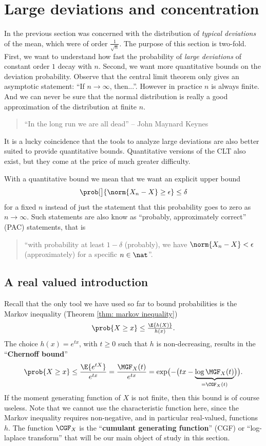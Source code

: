 \section{Large deviations and concentration}
\label{sec: concentration inequalities}

In the previous section was concerned with the distribution of \emph{typical deviations} of
the mean, which were of order \(\frac1{\sqrt{n}}\). The purpose of this section is two-fold. First, we want to understand
how fast the probability of \emph{large deviations} of constant order \(1\) decay with \(n\).
Second, we want more quantitative bounds on the deviation probability.
Observe that the central limit theorem only gives an asymptotic statement:
``If \(n\to\infty\), then...''. However in practice \(n\) is always finite.
And we can never be sure that the normal distribution is really a good
approximation of the distribution at finite \(n\).
\begin{quotation}
    ``In the long run we are all dead'' -- John Maynard Keynes 
\end{quotation}
It is a lucky coincidence that the tools to analyze large deviations are also
better suited to provide quantitative bounds. Quantitative versions of the CLT
also exist, but they come at the price of much greater difficulty.

With a quantitative bound we mean that we want an explicit upper bound
\[
    \prob[\big]{\norm{X_n - X} \ge \epsilon} \le \delta
\]
for a fixed \(n\) instead of just the statement that this probability goes to zero as
\(n\to\infty\). Such statements are also know as ``probably, approximately
correct'' (PAC) statements, that is
\begin{quote}
``with probability at least \(1-\delta\) (probably), we have \(\norm{X_n - X} <
\epsilon\) (approximately) for a specific \(n\in \nat\)''.
\end{quote}

\subsection{A real valued introduction}

Recall that the only tool we have used so far to bound probabilities is the
Markov inequality (Theorem \ref{thm: markov inequality})
\[
    \prob{X \ge x} \le \tfrac{\E{h(X)}}{h(x)}.
\]
The choice \(h(x) = e^{tx}\), with \(t\ge 0\) such that \(h\) is
non-decreasing, results in the ``\textbf{Chernoff bound}''
\[
    \prob{X \ge x}
    \le \frac{\E{e^{t  X}}}{e^{t x}}
    = \frac{\MGF_X(t)}{e^{t x}}
    = \exp\bigl(-\bigl(t x - \underbrace{\log \MGF_X(t)}_{=\CGF_X(t)}\bigr)\bigr).
\]
If the moment generating function of \(X\) is not finite, then this bound is
of course useless. Note that we cannot use the characteristic function here,
since the Markov inequality requires non-negative, and in particular
real-valued, functions \(h\). The function \(\CGF_X\) is the ``\textbf{cumulant
generating function}'' (CGF) or ``log-laplace transform'' that will be our main object
of study in this section.


